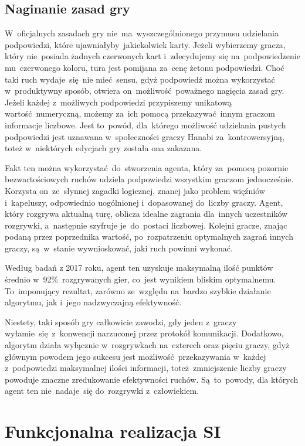 \documentclass[declaration,shortabstract,inz]{iithesis}
\begin{document}
\section{Naginanie zasad gry}

W~oficjalnych zasadach gry nie~ma~wyszczególnionego przymusu udzielania podpowiedzi, które ujawniałyby jakiekolwiek karty. Jeżeli wybierzemy gracza, który nie~posiada żadnych czerwonych kart i~zdecydujemy się na~podpowiedzenie mu~czerwonego koloru, tura jest pomijana za~cenę żetonu podpowiedzi. Choć taki ruch wydaje~się~nie mieć sensu, gdyż podpowiedź można wykorzystać w~produktywny sposób, otwiera on~możliwość poważnego nagięcia zasad gry. Jeżeli każdej z~możliwych podpowiedzi przypiszemy unikatową wartość numeryczną, możemy za~ich pomocą przekazywać innym graczom informacje liczbowe. Jest to~powód, dla~którego możliwość udzielania pustych podpowiedzi jest uznawana w~społeczności graczy Hanabi za~kontrowersyjną, toteż w~niektórych edycjach gry została ona zakazana.

Fakt ten można wykorzystać do~stworzenia agenta, który za~pomocą pozornie bezwartościowych ruchów udziela podpowiedzi wszystkim graczom jednocześnie. Korzysta on~ze~słynnej zagadki logicznej, znanej jako problem więźniów i~kapeluszy, odpowiednio uogólnionej i~dopasowanej do~liczby graczy. Agent, który rozgrywa aktualną turę, oblicza idealne zagrania dla~innych uczestników rozgrywki, a~następnie szyfruje je~do~postaci liczbowej. Kolejni gracze, znając podaną przez poprzednika wartość, po~rozpatrzeniu optymalnych zagrań innych graczy, są~w~stanie wywnioskować, jaki ruch powinni wykonać.

Według badań z 2017 roku\cite{HatPlayer}, agent ten uzyskuje maksymalną ilość punktów średnio w~92\%~rozgrywanych gier, co~jest wynikiem bliskim optymalnemu. To~imponujący rezultat, zarówno ze~względu na~bardzo szybkie działanie algorytmu, jak i~jego nadzwyczajną efektywność.

Niestety, taki sposób gry całkowicie zawodzi, gdy jeden z~graczy wyłamie~się z~konwencji narzuconej przez protokół komunikacji. Dodatkowo, algorytm działa wyłącznie w~rozgrywkach na~czterech oraz pięciu graczy, gdyż głównym powodem jego sukcesu jest możliwość przekazywania w~każdej z~podpowiedzi maksymalnej ilości informacji, toteż~zmniejszenie liczby graczy powoduje znaczne zredukowanie efektywności ruchów. Są~to~powody, dla których agent ten nie~nadaje~się do~rozgrywki z~człowiekiem.

\chapter{Funkcjonalna realizacja SI}
\end{document}
